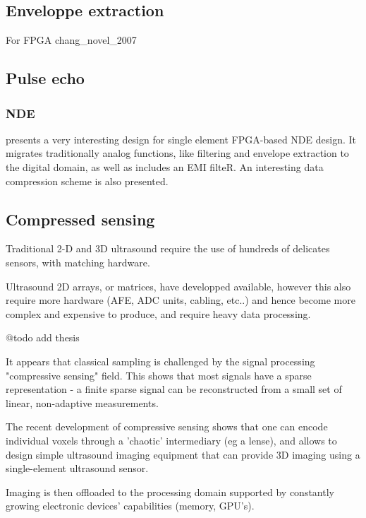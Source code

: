 \documentclass[conference]{IEEEtran}
\begin{document}
\subsection{Enveloppe extraction}

For FPGA
chang_novel_2007

\subsection{Pulse echo}


\subsubsection{NDE}

\cite{fritsch_full_nodate} presents a very interesting design for single element FPGA-based NDE design. It migrates traditionally analog functions, like filtering and envelope extraction to   the   digital   domain, as well as includes an EMI filteR. An interesting data compression scheme is also presented.


\subsection{Compressed sensing}

Traditional 2-D and 3D ultrasound require the use of hundreds of delicates sensors, with matching hardware. 

Ultrasound 2D arrays, or matrices, have developped available, however this also require more hardware (AFE, ADC units, cabling, etc..) and hence become more
complex and expensive to produce, and require heavy data processing.

@todo add \cite{Fedjajevs_mscthesis_14_09_2016} thesis

It appears that classical sampling is challenged by the signal processing "compressive sensing" field. This shows that most signals have a sparse representation - a finite sparse signal can be reconstructed from a small set of linear, non-adaptive measurements.

The recent development of compressive sensing shows that one can encode individual voxels through a 'chaotic' intermediary (eg a lense), and allows to design simple ultrasound imaging equipment that can provide 3D imaging using a single-element ultrasound sensor.  

Imaging is then offloaded to the processing domain supported by constantly growing electronic devices' capabilities (memory, GPU's).
\end{document}
